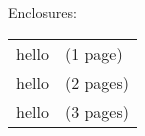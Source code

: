 
\renewcommand{\recip}{Company}
\renewcommand{\comp}{Program} %
\renewcommand{\recipaddress}{Street\\
City, Prov\hspace{6pt}xxx~xxx\\
Canada}

\renewcommand{\addressprefix}{}
\renewcommand{\addresssuffix}{\\
(604) 222-1047 ext. 6859
| \href{mailto:lighthall@triumf.ca}{lighthall@triumf.ca}\\%
}


\vspace*{2.0\baselineskip}
\noindent Enclosures:\\
\vspace*{-10pt}
\renewcommand{\arraystretch}{1.0} %

\begin{tabular}{ll}%
\hspace{-6pt}hello & (1 page)\\
\hspace{-6pt}hello & (2 pages)\\
\hspace{-6pt}hello & (3 pages)\\
\end{tabular}%
